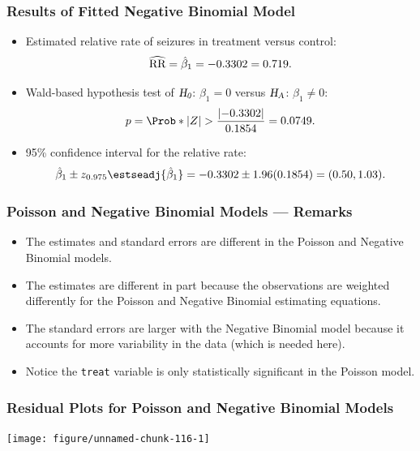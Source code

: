 \documentclass[oneside]{book}\usepackage[]{graphicx}\usepackage[svgnames]{xcolor}
\newenvironment{knitrout}{}{} %
\let\exp\relax%
\newcommand{\HN}{\textsl{H}_{\textsl{0}}}%
\newcommand{\HA}{\textsl{H}_{\textsl{A}}}%
\newcommand{\RR}{\text{RR}}%
\DeclarePairedDelimiter\abs{\lvert}{\rvert}
\begin{document}
\subsubsection*{Results of Fitted Negative Binomial Model}
\begin{itemize}
      \item Estimated relative rate of seizures in treatment versus control:
            \[ \widehat{\RR}=\exp{\hat{\beta}_1}=\exp{-0.3302}=0.719. \]
      \item Wald-based hypothesis test of $ \HN $: $ \beta_1=0 $ versus $ \HA $: $ \beta_1\ne 0 $:
            \[ p=\Prob*{\abs{Z}>\frac{\abs{-0.3302}}{0.1854}}=0.0749. \]
      \item 95\% confidence interval for the relative rate:
            \[ \exp{\hat{\beta}_1\pm z_{0.975}\estseadj{\hat{\beta}_1}}=\exp{-0.3302\pm 1.96(0.1854)}=(0.50,1.03). \]
\end{itemize}
\subsubsection*{Poisson and Negative Binomial Models --- Remarks}
\begin{itemize}
      \item The estimates and standard errors are different in the Poisson and Negative
            Binomial models.
      \item The estimates are different in part because the observations are weighted
            differently for the Poisson and Negative Binomial estimating equations.
      \item The standard errors are larger with the Negative Binomial model because it
            accounts for more variability in the data (which is needed here).
      \item Notice the \texttt{treat} variable is only statistically significant in the Poisson model.
\end{itemize}
\subsubsection*{Residual Plots for Poisson and Negative Binomial Models}
\begin{knitrout}
\color{fgcolor}

{\centering \texttt{[image: figure/unnamed-chunk-116-1]} 

}


\end{knitrout}
\end{document}
